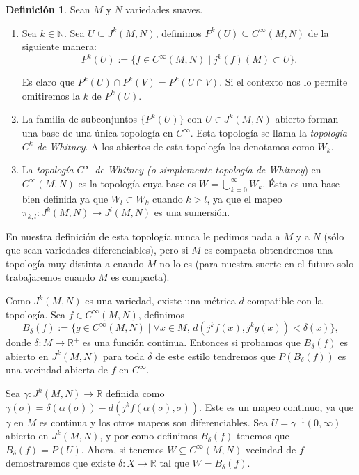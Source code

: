 \documentclass{report}
\theoremstyle{definition}
\newtheorem{defi}[theorem]{Definici\'on}
\begin{document}
\begin{defi}
Sean $M$ y $N$ variedades suaves.
\begin{enumerate}
\item Sea $k \in \mathbb{N}$. Sea $U \subseteq J^k (M,N)$, definimos $P^k(U) \subseteq C^\infty (M,N)$ de la siguiente manera: $$P^k (U) := \{ f \in C^\infty (M, N) \mid j^k (f) (M) \subset U \} .$$

Es claro que $P^k(U) \cap P^k (V) = P^k (U \cap V)$. Si el contexto nos lo permite omitiremos la $k$ de $P^k(U)$.

\item La familia de subconjuntos $\{ P^k (U) \}$ con $U \in J^k (M,N)$ abierto forman una base de una \'unica topolog\'ia en $C^\infty$. Esta topolog\'ia se llama la \textit{topolog\'ia $C^k$ de Whitney}. A los abiertos de esta topolog\'ia los denotamos como $W_k$. 
\item La \textit{topolog\'ia $C^\infty$ de Whitney (o simplemente topolog\'ia de Whitney}) en $C^\infty (M, N)$ es la topolog\'ia cuya base es $W= \bigcup\limits_{k=0}^\infty W_k$. \'Esta es una base bien definida ya que $W_l \subset W_k$ cuando $k > l$, ya que el mapeo $\pi_{k,l}: J^k (M,N) \to J^l (M,N)$ es una sumersi\'on.
\end{enumerate}
\end{defi}
En nuestra definici\'on de esta topolog\'ia nunca le pedimos nada a $M$ y a $N$ (s\'olo que sean variedades diferenciables), pero si $M$ es compacta obtendremos una topolog\'ia muy distinta a cuando $M$ no lo es (para nuestra suerte en el futuro solo trabajaremos cuando $M$ es compacta).

Como $J^k (M, N) $ es una variedad, existe una m\'etrica $d$ compatible con la topolog\'ia. Sea $f \in C^\infty (M, N)$, definimos $$B_\delta (f) := \{ g \in C^\infty (M , N) \mid \forall x \in M, \, d(j^k f(x) , j^k g(x)) < \delta (x) \} , $$ donde $\delta : M \to \mathbb{R}^+$ es una funci\'on continua. Entonces si probamos que $B_\delta (f)$ es abierto en $J^k (M, N)$ para toda $\delta$ de este estilo tendremos que $P(B_\delta (f))$ es una vecindad abierta de $f$ en $C^\infty$. 

Sea $\gamma: J^k (M,N) \to \mathbb{R}$ definida como $\gamma (\sigma ) = \delta ( \alpha (\sigma) )- d(j^k f(\alpha(\sigma), \sigma ))$. Este es un mapeo continuo, ya que $\gamma$ en $M$ es continua y los otros mapeos son diferenciables. Sea $U = \gamma^{-1} (0, \infty)$ abierto en $J^k(M,N)$, y por como definimos $B_\delta (f)$ tenemos que $B_\delta (f)= P(U)$. Ahora, si tenemos $W \subseteq C^\infty (M,N)$ vecindad de $f$ demostraremos que existe $\delta: X \to \mathbb{R}$ tal que $W = B_\delta (f)$.
\end{document}
